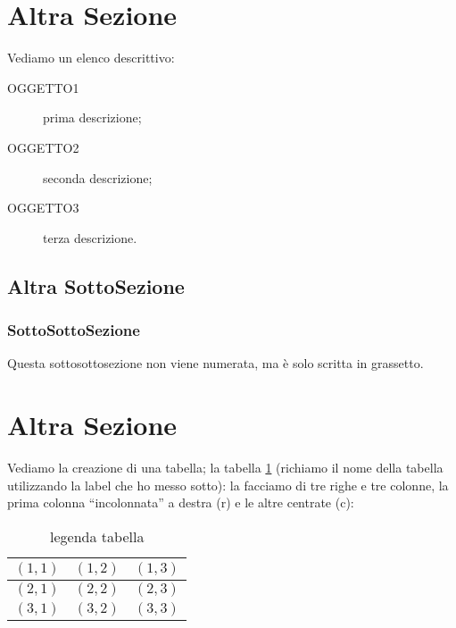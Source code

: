 \documentclass[12pt,a4paper,openright,twoside]{report}
\begin{document}
    \section{Altra Sezione}
    Vediamo un elenco descrittivo:
    \begin{description}                     %
        \item[OGGETTO1] prima descrizione;
        \item[OGGETTO2] seconda descrizione;
        \item[OGGETTO3] terza descrizione.
    \end{description}
    \subsection{Altra SottoSezione}
    \subsubsection{SottoSottoSezione}Questa sottosottosezione non viene
    numerata, ma \`e solo scritta in grassetto.
    \section{Altra Sezione}                 %
    Vediamo la creazione di una tabella; la tabella \ref{tab:uno}
    (richiamo il nome della tabella utilizzando la label che ho messo sotto):
    la facciamo di tre righe e tre colonne, la prima colonna
    ``incolonnata'' a destra (r) e le altre centrate (c):\\
    \begin{table}[h]                        %
        \begin{center}                          %
            \begin{tabular}{r|c|c}                  %
                \hline \hline                           %
                $(1,1)$ & $(1,2)$ & $(1,3)$\\           %
                \hline                                  %
                $(2,1)$ & $(2,2)$ & $(2,3)$\\           %
                \hline                                  %
                $(3,1)$ & $(3,2)$ & $(3,3)$\\
                \hline \hline
            \end{tabular}
            \caption[legenda elenco tabelle]{legenda tabella}\label{tab:uno}
        \end{center}
    \end{table}
\end{document}

